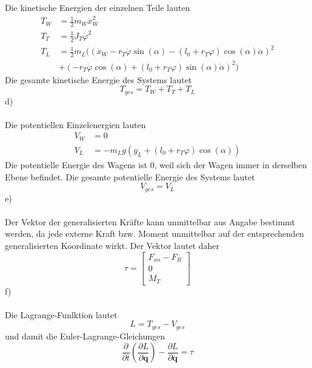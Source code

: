 Die kinetische Energien der einzelnen Teile lauten
\begin{align*}
	T_W &= \frac{1}{2}m_W\dot{x}^2_W \\
	T_T &= \frac{1}{2}J_T\dot{\varphi}^2 \\
	T_L &= \frac{1}{2}m_L ((	\dot{x}_W - r_T\dot{\varphi}\sin(\alpha) - (l_0 + r_T\varphi)\cos(\alpha)\dot{\alpha})^2 \\
	&+ (	-r_T\dot{\varphi}\cos(\alpha) + (l_0 + r_T\varphi)\sin(\alpha)\dot{\alpha})^2)
\end{align*}
Die gesamte kinetische Energie des Systems lautet
\[
	T_{ges} = T_W + T_T + T_L
\]
\newpage
\noindent
d)\\ \\
Die potentiellen Einzelenergien lauten
\begin{align*}
	V_W &= 0 \\
	V_L &= -m_L g (y_L + (l_0 + r_T\varphi)\cos(\alpha))
\end{align*}
Die potentielle Energie des Wagens ist 0, weil sich der Wagen immer in derselben Ebene befindet. Die gesamte potentielle Energie des Systems lautet
\[
	V_{ges} = V_L
\]
e)\\ \\
Der Vektor der generalisierten Kräfte kann unmittelbar aus Angabe bestimmt werden, da jede externe Kraft bzw. Moment unmittelbar auf der entsprechenden generalisierten Koordinate wirkt. Der Vektor lautet daher
\[
	\tau = \begin{bmatrix}
		F_{an} - F_R \\
		0 \\
		M_T
	\end{bmatrix}
\]
f)\\ \\
Die Lagrange-Funlktion lautet
\[
	L = T_{ges} - V_{ges}
\]
und damit die Euler-Lagrange-Gleichungen
\[
	\frac{\partial}{\partial t} \left( \frac{\partial L}{\partial \dot{\textbf{q}}}\right) - \frac{\partial L}{\partial \textbf{q}} =  \tau
\]